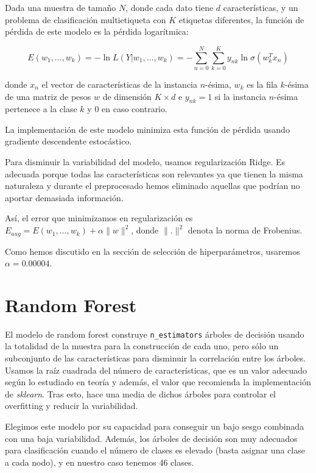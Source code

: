 \documentclass[a4]{article}
\begin{document}
Dada una muestra de tamaño $N$, donde cada dato tiene $d$
características, y un problema de clasificación multietiqueta con $K$
etiquetas diferentes, la función de pérdida de este modelo es la
pérdida logarítmica:

\[ E(w_1, \ldots, w_k) = -\ln L(Y|w_1, \ldots, w_k) = -\sum\limits_{n=0}^{N}\sum\limits_{k=0}^{K} y_{nk}\ln \sigma (w^T_kx_n)\]

donde $x_n$ el vector de características de la instancia $n$-ésima,
$w_k$ es la fila $k$-ésima de una matriz de pesos $w$ de dimensión
$K \times d$ e $y_{nk} = 1$ si la instancia $n$-ésima pertenece a la
clase $k$ y $0$ en caso contrario.

La implementación de este modelo minimiza esta función de pérdida
usando gradiente descendente estocástico.

Para disminuir la variabilidad del modelo, usamos regularización Ridge. Es adecuada porque todas las características son relevantes ya que tienen la misma naturaleza y durante el preprocesado hemos eliminado aquellas que podrían no aportar demasiada información.

Así, el error que minimizamos en regularización es $E_{aug} = E(w_1, \ldots, w_k) + \alpha \|w\|^2$, donde $\|.\|^2$ denota la norma de Frobenius.

Como hemos discutido en la sección de selección de hiperparámetros, usaremos $\alpha = 0.00004$.

\section{Random Forest}

El modelo de random forest construye \texttt{n\_estimators} árboles de
decisión usando la totalidad de la muestra para la construcción de
cada uno, pero sólo un subconjunto de las características para
disminuir la correlación entre los árboles. Usamos la raíz cuadrada
del número de características, que es un valor adecuado según lo
estudiado en teoría y además, el valor que recomienda la
implementación de \textit{sklearn}. Tras esto, hace una media de
dichos árboles para controlar el overfitting y reducir la
variabilidad.

Elegimos este modelo por su capacidad para conseguir un bajo sesgo
combinada con una baja variabilidad. Además, los árboles de decisión
son muy adecuados para clasificación cuando el número de clases es
elevado (basta asignar una clase a cada nodo), y en nuestro caso
tenemos 46 clases.
\end{document}
